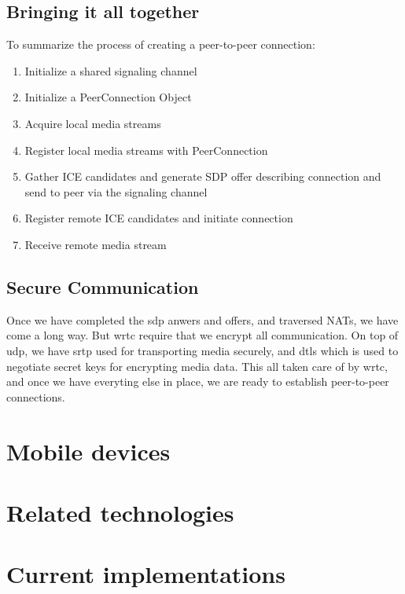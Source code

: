 \subsection{Bringing it all together}
To summarize the process of creating a peer-to-peer connection:

\begin{enumerate}
\item{Initialize a shared signaling channel}
\item{Initialize a PeerConnection Object}
\item{Acquire local media streams}
\item{Register local media streams with PeerConnection}
\item{Gather ICE candidates and generate SDP offer describing connection and send to peer via the signaling channel}
\item{Register remote ICE candidates and initiate connection}
\item{Receive remote media stream}
\end{enumerate} 


\subsection{Secure Communication}
Once we have completed the \gls{sdp} anwers and offers, and traversed NATs, we have come a long way. But \gls{wrtc} require that we encrypt all communication. On top of \gls{udp}, we have \gls{srtp} used for transporting media securely, and \gls{dtls} which is used to negotiate secret keys for encrypting media data. This all taken care of by \gls{wrtc}, and once we have everyting else in place, we are ready to establish peer-to-peer connections.

\section{Mobile devices}


\section{Related technologies}

\section{Current implementations}

